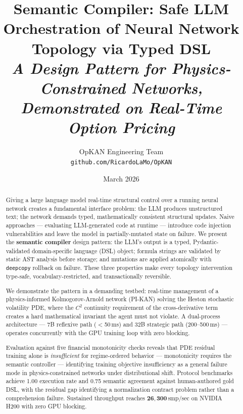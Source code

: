 \documentclass[11pt,a4paper]{article}
\title{\textbf{Semantic Compiler: Safe LLM Orchestration of Neural Network Topology via Typed DSL}\\[0.5em]
\large\textit{A Design Pattern for Physics-Constrained Networks, Demonstrated on Real-Time Option Pricing}}
\author{
  OpKAN Engineering Team\\
  \texttt{github.com/RicardoLaMo/OpKAN}
}
\date{March 2026}
\begin{document}
\maketitle

\begin{abstract}
Giving a large language model real-time structural control over a running neural
network creates a fundamental interface problem: the LLM produces unstructured text;
the network demands typed, mathematically consistent structural updates. Naive
approaches --- evaluating LLM-generated code at runtime --- introduce code injection
vulnerabilities and leave the model in partially-mutated state on failure. We present
the \textbf{semantic compiler} design pattern: the LLM's output is a typed,
Pydantic-validated domain-specific language (DSL) object; formula strings are
validated by static AST analysis before storage; and mutations are applied atomically
with \texttt{deepcopy} rollback on failure. These three properties make every
topology intervention type-safe, vocabulary-restricted, and transactionally reversible.

We demonstrate the pattern in a demanding testbed: real-time management of a
physics-informed Kolmogorov-Arnold network (PI-KAN) solving the Heston stochastic
volatility PDE, where the $C^2$ continuity requirement of the cross-derivative term
creates a hard mathematical invariant the agent must not violate. A dual-process
architecture --- 7B reflexive path ($<$50\,ms) and 32B strategic path (200--500\,ms)
--- operates concurrently with the GPU training loop with zero blocking.

Evaluation against five financial monotonicity checks reveals that PDE residual
training alone is \emph{insufficient} for regime-ordered behavior --- monotonicity
requires the semantic controller --- identifying training objective insufficiency as a
general failure mode in physics-constrained networks under distributional shift.
Protocol benchmarks achieve 1.00 execution rate and 0.75 semantic agreement against
human-authored gold DSL, with the residual gap identifying a normalization contract
problem rather than a comprehension failure. Sustained throughput reaches
$\mathbf{26{,}300}$\,smp/sec on NVIDIA H200 with zero GPU blocking.
\end{abstract}

\tableofcontents
\newpage

\end{document}
